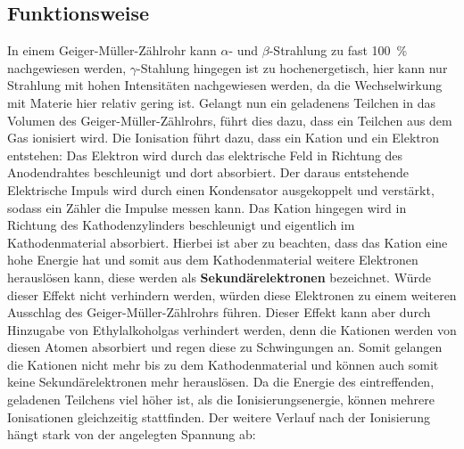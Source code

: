 \subsection{Funktionsweise}
In einem Geiger-Müller-Zählrohr kann $\alpha$- und $\beta$-Strahlung zu fast \SI{100}{\percent} nachgewiesen werden, $\gamma$-Stahlung hingegen ist zu hochenergetisch, hier kann nur
Strahlung mit hohen Intensitäten nachgewiesen werden, da die Wechselwirkung mit Materie hier relativ gering ist.
Gelangt nun ein geladenens Teilchen in das Volumen des Geiger-Müller-Zählrohrs, führt dies dazu, dass ein Teilchen aus dem Gas ionisiert wird. Die
Ionisation führt dazu, dass ein Kation und ein Elektron entstehen: Das Elektron wird durch das elektrische Feld in Richtung des Anodendrahtes beschleunigt
und dort absorbiert. Der daraus entstehende Elektrische Impuls wird durch einen Kondensator ausgekoppelt und verstärkt, sodass ein Zähler die Impulse messen kann.
Das Kation hingegen wird in Richtung des Kathodenzylinders beschleunigt und eigentlich im Kathodenmaterial absorbiert. Hierbei ist
aber zu beachten, dass das Kation eine hohe Energie hat und somit aus dem Kathodenmaterial weitere Elektronen herauslösen kann, diese werden
als \textbf{Sekundärelektronen} bezeichnet. Würde dieser Effekt nicht verhindern werden, würden diese Elektronen zu einem weiteren Ausschlag des Geiger-Müller-Zählrohrs
führen. Dieser Effekt kann aber durch Hinzugabe von Ethylalkoholgas verhindert werden, denn die Kationen werden von diesen Atomen absorbiert und regen diese
zu Schwingungen an. Somit gelangen die Kationen nicht mehr bis zu dem Kathodenmaterial und können auch somit keine Sekundärelektronen mehr herauslösen.
Da die Energie des eintreffenden, geladenen Teilchens viel höher ist, als die Ionisierungsenergie, können mehrere Ionisationen gleichzeitig stattfinden.
Der weitere Verlauf nach der Ionisierung hängt stark von der angelegten Spannung ab:
